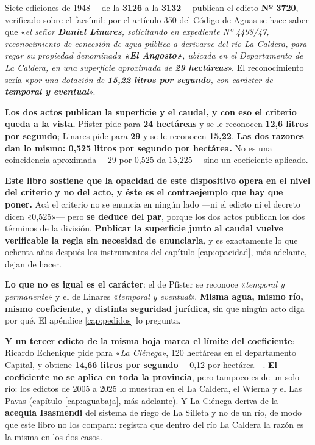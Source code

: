 Siete ediciones de 1948 ---de la \textbf{3126} a la \textbf{3132}--- publican el edicto
\textbf{Nº 3720}, verificado sobre el facsímil: por el artículo 350 del Código de Aguas se hace
saber que «\textit{el señor \textbf{Daniel Linares}, solicitando en expediente Nº 4498/47,
reconocimiento de concesión de agua pública a derivarse del río La Caldera, para regar su
propiedad denominada \textbf{«El Angosto»}, ubicada en el Departamento de La Caldera, en una
superficie aproximada de \textbf{29 hectáreas}}». El reconocimiento sería «\textit{por una
dotación de \textbf{15,22 litros por segundo}, con carácter de \textbf{temporal y eventual}}».

\begin{cautela}
\textbf{Los dos actos publican la superficie y el caudal, y con eso el criterio queda a la
vista.} Pfister pide para \textbf{24 hectáreas} y se le reconocen \textbf{12,6 litros por
segundo}; Linares pide para \textbf{29} y se le reconocen \textbf{15,22}. \textbf{Las dos
razones dan lo mismo: 0,525 litros por segundo por hectárea.} No es una coincidencia
aproximada ---29 por 0,525 da 15,225--- sino un coeficiente aplicado.

\textbf{Este libro sostiene que la opacidad de este dispositivo opera en el nivel del
criterio y no del acto, y éste es el contraejemplo que hay que poner.} Acá el criterio no se
enuncia en ningún lado ---ni el edicto ni el decreto dicen «0,525»--- pero \textbf{se deduce
del par}, porque los dos actos publican los dos términos de la división. \textbf{Publicar la
superficie junto al caudal vuelve verificable la regla sin necesidad de enunciarla}, y es
exactamente lo que ochenta años después los instrumentos del capítulo \ref{cap:opacidad}, más adelante, dejan
de hacer.

\textbf{Lo que no es igual es el carácter}: el de Pfister se reconoce «\textit{temporal y
permanente}» y el de Linares «\textit{temporal y eventual}». \textbf{Misma agua, mismo río,
mismo coeficiente, y distinta seguridad jurídica}, sin que ningún acto diga por qué. El
apéndice \ref{cap:pedidos} lo pregunta.

\textbf{Y un tercer edicto de la misma hoja marca el límite del coeficiente}: Ricardo
Echenique pide para «\textit{La Ciénega}», 120 hectáreas en el departamento Capital, y obtiene
\textbf{14,66 litros por segundo} ---0,12 por hectárea---. \textbf{El coeficiente no se
aplica en toda la provincia}, pero tampoco es de un solo río: los edictos de 2005 a 2025 lo muestran en el La Caldera, el Wierna y el Las Pavas (capítulo \ref{cap:aguabaja}, más adelante). Y La Ciénega deriva de la \textbf{acequia Isasmendi} del
sistema de riego de La Silleta y no de un río, de modo que este libro no los compara: registra
que dentro del río La Caldera la razón es la misma en los dos casos.


\end{cautela}
